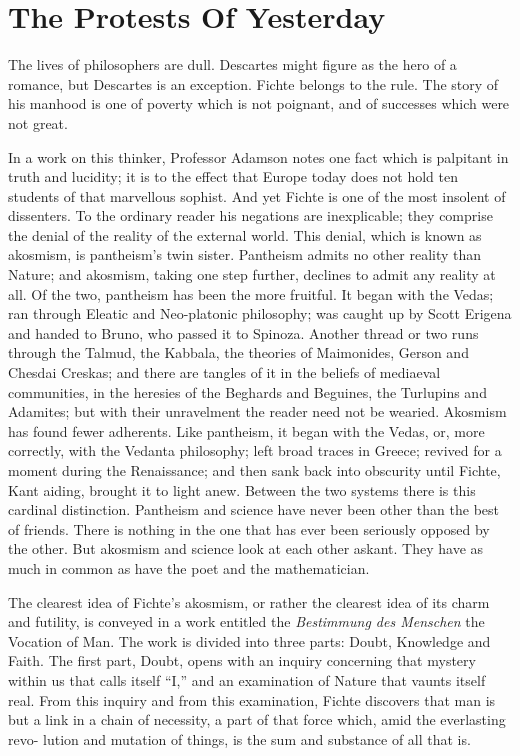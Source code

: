 \documentclass[]{book}
\begin{document}
\chapter{The Protests Of Yesterday}\label{the-protests-of-yesterday}

The lives of philosophers are dull. Descartes might figure as the hero
of a romance, but Descartes is an exception. Fichte belongs to the rule.
The story of his manhood is one of poverty which is not poignant, and of
successes which were not great.

In a work on this thinker, Professor Adamson notes one fact which is
palpitant in truth and lucidity; it is to the effect that Europe today
does not hold ten students of that marvellous sophist. And yet Fichte is
one of the most insolent of dissenters. To the ordinary reader his
negations are inexplicable; they comprise the denial of the reality of
the external world. This denial, which is known as akosmism, is
pantheism's twin sister. Pantheism admits no other reality than Nature;
and akosmism, taking one step further, declines to admit any reality at
all. Of the two, pantheism has been the more fruitful. It began with the
Vedas; ran through Eleatic and Neo-platonic philosophy; was caught up by
Scott Erigena and handed to Bruno, who passed it to Spinoza. Another
thread or two runs through the Talmud, the Kabbala, the theories of
Maimonides, Gerson and Chesdai Creskas; and there are tangles of it in
the beliefs of mediaeval communities, in the heresies of the Beghards
and Beguines, the Turlupins and Adamites; but with their unravelment the
reader need not be wearied. Akosmism has found fewer adherents. Like
pantheism, it began with the Vedas, or, more correctly, with the Vedanta
philosophy; left broad traces in Greece; revived for a moment during the
Renaissance; and then sank back into obscurity until Fichte, Kant
aiding, brought it to light anew. Between the two systems there is this
cardinal distinction. Pantheism and science have never been other than
the best of friends. There is nothing in the one that has ever been
seriously opposed by the other. But akosmism and science look at each
other askant. They have as much in common as have the poet and the
mathematician.

The clearest idea of Fichte's akosmism, or rather the clearest idea of
its charm and futility, is conveyed in a work entitled the
\emph{Bestimmung des Menschen} the Vocation of Man. The work is divided
into three parts: Doubt, Knowledge and Faith. The first part, Doubt,
opens with an inquiry concerning that mystery within us that calls
itself ``I,'' and an examination of Nature that vaunts itself real. From
this inquiry and from this examination, Fichte discovers that man is but
a link in a chain of necessity, a part of that force which, amid the
everlasting revo- lution and mutation of things, is the sum and
substance of all that is.
\end{document}
